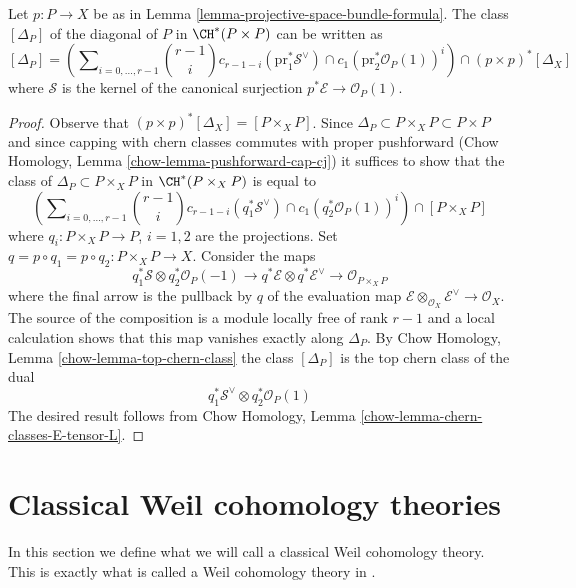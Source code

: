 \begin{lemma}
\label{lemma-diagonal-projective-bundle}
Let $p : P \to X$ be as in Lemma \ref{lemma-projective-space-bundle-formula}.
The class $[\Delta_P]$ of the diagonal of $P$ in $\CH^*(P \times P)$
can be written
as
$$
[\Delta_P] =
\left(\sum\nolimits_{i = 0, \ldots, r - 1}
{r - 1 \choose i} c_{r - 1 - i}(\text{pr}_1^*\mathcal{S}^\vee) \cap
c_1(\text{pr}_2^*\mathcal{O}_P(1))^i\right)
\cap
(p \times p)^*[\Delta_X]
$$
where $\mathcal{S}$ is the kernel of the canonical surjection
$p^*\mathcal{E} \to \mathcal{O}_P(1)$.
\end{lemma}

\begin{proof}
Observe that $(p \times p)^*[\Delta_X] = [P \times_X P]$.
Since $\Delta_P \subset P \times_X P \subset P \times P$
and since capping with chern classes commutes with proper pushforward
(Chow Homology, Lemma \ref{chow-lemma-pushforward-cap-cj})
it suffices to show that the class of
$\Delta_P \subset P \times_X P$ in $\CH^*(P \times_X P)$
is equal to
$$
\left(\sum\nolimits_{i = 0, \ldots, r - 1}
{r - 1 \choose i} c_{r - 1 - i}(q_1^*\mathcal{S}^\vee) \cap
c_1(q_2^*\mathcal{O}_P(1))^i\right)
\cap
[P \times_X P]
$$
where $q_i : P \times_X P \to P$, $i = 1, 2$ are the projections.
Set $q = p \circ q_1 = p \circ q_2 : P \times_X P \to X$.
Consider the maps
$$
q_1^*\mathcal{S} \otimes q_2^*\mathcal{O}_P(-1) \to
q^*\mathcal{E} \otimes q^*\mathcal{E}^\vee \to
\mathcal{O}_{P \times_X P}
$$
where the final arrow is the pullback by $q$ of the evaluation map
$\mathcal{E} \otimes_{\mathcal{O}_X} \mathcal{E}^\vee \to \mathcal{O}_X$.
The source of the composition is a module locally free of rank $r - 1$
and a local calculation shows that this map vanishes exactly along
$\Delta_P$. By Chow Homology, Lemma \ref{chow-lemma-top-chern-class}
the class $[\Delta_P]$ is the top chern class of the dual
$$
q_1^*\mathcal{S}^\vee \otimes q_2^*\mathcal{O}_P(1)
$$
The desired result follows from Chow Homology, Lemma
\ref{chow-lemma-chern-classes-E-tensor-L}.
\end{proof}








\section{Classical Weil cohomology theories}
\label{section-axioms-classical}

\noindent
In this section we define what we will call a classical Weil cohomology
theory. This is exactly what is called a Weil cohomology theory in
\cite[Section 1.2]{Kleiman-cycles}.

